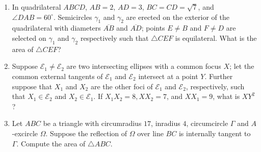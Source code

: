 \documentclass[10pt]{article}
\begin{document}
\begin{enumerate}
\item In quadrilateral $ABCD$, $AB=2$, $AD=3$, $BC=CD=\sqrt7$, and $\angle DAB=60^\circ$. Semicircles $\gamma_1$ and $\gamma_2$ are erected on the exterior of the quadrilateral with diameters $\overline{AB}$ and $\overline{AD}$; points $E\neq B$ and $F\neq D$ are selected on $\gamma_1$ and $\gamma_2$ respectively such that $\triangle CEF$ is equilateral. What is the area of $\triangle CEF$?

\item Suppose $\mathcal{E}_1 \neq \mathcal{E}_2$ are two intersecting ellipses with a common focus $X$; let the common external tangents of $\mathcal{E}_1$ and $\mathcal{E}_2$ intersect at a point $Y$. Further suppose that $X_1$ and $X_2$ are the other foci of $\mathcal{E}_1$ and $\mathcal{E}_2$, respectively, such that $X_1\in \mathcal{E}_2$ and $X_2\in \mathcal{E}_1$. If $X_1X_2=8, XX_2=7$, and $XX_1=9$, what is $XY^2$?

\item Let $ABC$ be a triangle with circumradius $17$, inradius $4$, circumcircle $\Gamma$ and $A$-excircle $\Omega$. Suppose the reflection of $\Omega$ over line $BC$ is internally tangent to $\Gamma$.  Compute the area of $\triangle ABC$.

\end{enumerate}
\end{document}

